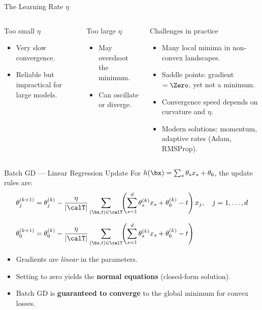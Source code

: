 \begin{frame}{The Learning Rate $\eta$}
  \begin{columns}[t]
      \begin{block}{Too small $\eta$}
        \begin{itemize}
          \item Very slow convergence.
          \item Reliable but impractical for large models.
        \end{itemize}
      \end{block}
      \vspace{6pt}
      \begin{alertblock}{Too large $\eta$}
        \begin{itemize}
          \item May overshoot the minimum.
          \item Can oscillate or diverge.
        \end{itemize}
      \end{alertblock}
      \begin{block}{Challenges in practice}
        \begin{itemize}
          \item Many local minima in non-convex landscapes.
          \item Saddle points: gradient $= \Zero$, yet not a minimum.
          \item Convergence speed depends on curvature and $\eta$.
          \item Modern solutions: momentum, adaptive rates (Adam, RMSProp).
        \end{itemize}
      \end{block}
  \end{columns}
\end{frame}

\begin{frame}{Batch GD — Linear Regression Update}
  For $h(\bx) = \sum_s \theta_s x_s + \theta_0$, the update rules are:
  \begin{align*}
    \theta_j^{(k+1)} &= \theta_j^{(k)}
      - \frac{\eta}{|\calT|}
      \sum_{(\bx,t)\in\calT}
      \!\!\left(\sum_{s=1}^d\theta_s^{(k)}x_s+\theta_0^{(k)}-t\right)x_j,
      \quad j=1,\ldots,d\\[6pt]
    \theta_0^{(k+1)} &= \theta_0^{(k)}
      - \frac{\eta}{|\calT|}
      \sum_{(\bx,t)\in\calT}
      \!\!\left(\sum_{s=1}^d\theta_s^{(k)}x_s+\theta_0^{(k)}-t\right)
  \end{align*}
  \begin{itemize}
    \item Gradients are \emph{linear} in the parameters.
    \item Setting to zero yields the \textbf{normal equations} (closed-form solution).
    \item Batch GD is \textbf{guaranteed to converge} to the global minimum for convex losses.
  \end{itemize}
\end{frame}

